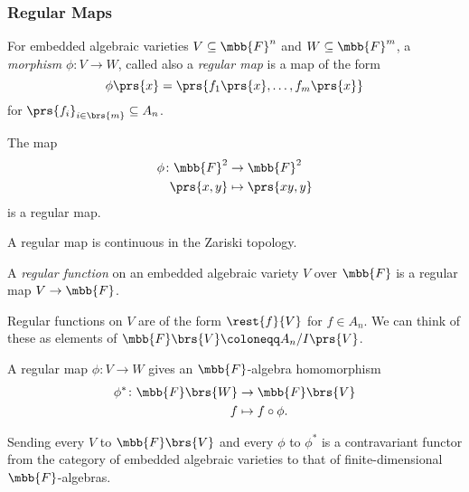 \documentclass[10pt,a4paper,twoside,openany,hidelinks]{book}
\begin{document}
\subsubsection{Regular Maps}

\begin{definition}
For embedded algebraic varieties $V \subseteq \mbb{F}^n$ and $W \subseteq \mbb{F}^m$, a \emph{morphism} $\phi \colon V \to W$, called also a \emph{regular map} is a map of the form
\[\phi\prs{x} = \prs{f_1\prs{x}, \ldots, f_m\prs{x}}\]
for $\prs{f_i}_{i \in \brs{m}} \subseteq A_n$.
\end{definition}

\begin{example}
The map
\begin{align*}
\phi \colon \mbb{F}^2 &\to \mbb{F}^2 \\
\prs{x,y} &\mapsto \prs{xy,y} 
\end{align*}
is a regular map.
\end{example}

\begin{exercise}
A regular map is continuous in the Zariski topology.
\end{exercise}

\begin{definition}
A \emph{regular function} on an embedded algebraic variety $V$ over $\mbb{F}$ is a regular map $V \to \mbb{F}$.
\end{definition}

\begin{remark}
Regular functions on $V$ are of the form $\rest{f}{V}$ for $f \in A_n$. We can think of these as elements of $\mbb{F}\brs{V} \coloneqq A_n / I\prs{V}$.
\end{remark}

\begin{definition}
A regular map $\phi \colon V \to W$ gives an $\mbb{F}$-algebra homomorphism
\begin{align*}
\phi^* \colon \mbb{F}\brs{W} &\to \mbb{F}\brs{V} \\
f &\mapsto f \circ \phi \text{.}
\end{align*}
\end{definition}

\begin{remark}
Sending every $V$ to $\mbb{F}\brs{V}$ and every $\phi$ to $\phi^*$ is a contravariant functor from the category of embedded algebraic varieties to that of finite-dimensional $\mbb{F}$-algebras.
\end{remark}
\end{document}
